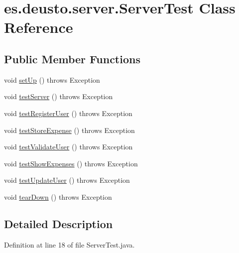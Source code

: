 \hypertarget{classes_1_1deusto_1_1server_1_1_server_test}{}\section{es.\+deusto.\+server.\+Server\+Test Class Reference}
\label{classes_1_1deusto_1_1server_1_1_server_test}
\subsection*{Public Member Functions}
\begin{DoxyCompactItemize}
\item 
void \hyperlink{classes_1_1deusto_1_1server_1_1_server_test_af715b0b972d52aaa4d90bf086f990921}{set\+Up} ()  throws Exception 
\item 
void \hyperlink{classes_1_1deusto_1_1server_1_1_server_test_a9c697e77e1422a1d0835f6e6a38036f4}{test\+Server} ()  throws Exception 
\item 
void \hyperlink{classes_1_1deusto_1_1server_1_1_server_test_ab50ebca6957682f2a7e6e51dc06278cf}{test\+Register\+User} ()  throws Exception 
\item 
void \hyperlink{classes_1_1deusto_1_1server_1_1_server_test_a7406203a7ff08400597008ca722f6205}{test\+Store\+Expense} ()  throws Exception 
\item 
void \hyperlink{classes_1_1deusto_1_1server_1_1_server_test_af493f29fde42af9e7d4c065f49bf8502}{test\+Validate\+User} ()  throws Exception 
\item 
void \hyperlink{classes_1_1deusto_1_1server_1_1_server_test_ade86728a524037a1712106cd4741c690}{test\+Show\+Expenses} ()  throws Exception 
\item 
void \hyperlink{classes_1_1deusto_1_1server_1_1_server_test_ad64ead953df265e40d07bdc0ab11137c}{test\+Update\+User} ()  throws Exception
\item 
void \hyperlink{classes_1_1deusto_1_1server_1_1_server_test_ae5b24fbf4e2fab33b952766c5f56ed73}{tear\+Down} ()  throws Exception 
\end{DoxyCompactItemize}


\subsection{Detailed Description}


Definition at line 18 of file Server\+Test.\+java.



